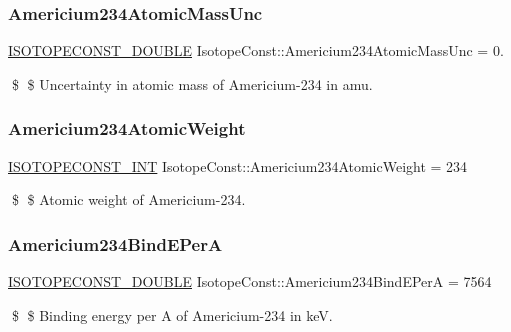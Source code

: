 \subsubsection{\texorpdfstring{Americium234\+Atomic\+Mass\+Unc}{Americium234AtomicMassUnc}}
{\footnotesize\ttfamily \mbox{\hyperlink{group___isotope_const-_macros_ga8f45a7272ce02c0b4c65c44636ed719a}{I\+S\+O\+T\+O\+P\+E\+C\+O\+N\+S\+T\+\_\+\+D\+O\+U\+B\+LE}} Isotope\+Const\+::\+Americium234\+Atomic\+Mass\+Unc = 0.}

\$ \$ Uncertainty in atomic mass of Americium-\/234 in amu. \mbox{\label{group___isotope_const-_americium-_am234_ga7952c4e8f01b68f31c19d4154795c41f}} 
\subsubsection{\texorpdfstring{Americium234\+Atomic\+Weight}{Americium234AtomicWeight}}
{\footnotesize\ttfamily \mbox{\hyperlink{group___isotope_const-_macros_ga5f18360b3e99483a35c32d789e62621c}{I\+S\+O\+T\+O\+P\+E\+C\+O\+N\+S\+T\+\_\+\+I\+NT}} Isotope\+Const\+::\+Americium234\+Atomic\+Weight = 234}

\$ \$ Atomic weight of Americium-\/234. \mbox{\label{group___isotope_const-_americium-_am234_ga859d5d18b9489b8872896912feb3df3e}} 
\subsubsection{\texorpdfstring{Americium234\+Bind\+E\+PerA}{Americium234BindEPerA}}
{\footnotesize\ttfamily \mbox{\hyperlink{group___isotope_const-_macros_ga8f45a7272ce02c0b4c65c44636ed719a}{I\+S\+O\+T\+O\+P\+E\+C\+O\+N\+S\+T\+\_\+\+D\+O\+U\+B\+LE}} Isotope\+Const\+::\+Americium234\+Bind\+E\+PerA = 7564}

\$ \$ Binding energy per A of Americium-\/234 in keV. \mbox{\label{group___isotope_const-_americium-_am234_ga5287f677ec51b5e252c68951fa5fae52}} 
